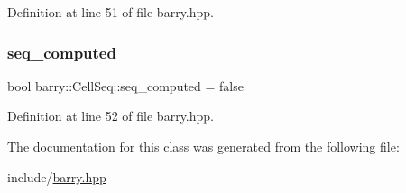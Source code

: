Definition at line 51 of file barry.\+hpp.

\mbox{\label{classbarry_1_1_cell_seq_ae494832512818af7c82315c7f5655db0}} 
\subsubsection{\texorpdfstring{seq\+\_\+computed}{seq\_computed}}
{\footnotesize\ttfamily bool barry\+::\+Cell\+Seq\+::seq\+\_\+computed = false\hspace{0.3cm}{\ttfamily [protected]}}



Definition at line 52 of file barry.\+hpp.



The documentation for this class was generated from the following file\+:\begin{DoxyCompactItemize}
\item 
include/\hyperlink{barry_8hpp}{barry.\+hpp}\end{DoxyCompactItemize}

